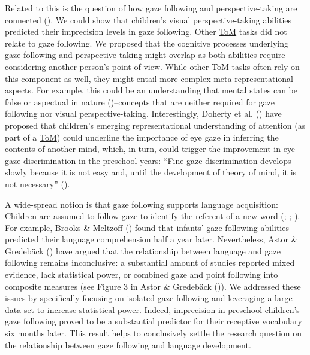 \documentclass[
]{scrbook}
\begin{document}
Related to this is the question of how gaze following and perspective-taking are connected (). We could show that children's visual perspective-taking abilities predicted their imprecision levels in gaze following. Other \hyperref[acronyms_ToM]{ToM} tasks did not relate to gaze following. We proposed that the cognitive processes underlying gaze following and perspective-taking might overlap as both abilities require considering another person's point of view. While other \hyperref[acronyms_ToM]{ToM} tasks often rely on this component as well, they might entail more complex meta-representational aspects. For example, this could be an understanding that mental states can be false or aspectual in nature ()\thinspace --\thinspace concepts that are neither required for gaze following nor visual perspective-taking. Interestingly, Doherty et al. () have proposed that children's emerging representational understanding of attention (as part of a \hyperref[acronyms_ToM]{ToM}) could underline the importance of eye gaze in inferring the contents of another mind, which, in turn, could trigger the improvement in eye gaze discrimination in the preschool years: ``Fine gaze discrimination develops slowly because it is not easy and, until the development of theory of mind, it is not necessary'' ().

A wide-spread notion is that gaze following supports language acquisition: Children are assumed to follow gaze to identify the referent of a new word (; ; ). For example, Brooks \& Meltzoff () found that infants' gaze-following abilities predicted their language comprehension half a year later. Nevertheless, Astor \& Gredebäck () have argued that the relationship between language and gaze following remains inconclusive: a substantial amount of studies reported mixed evidence, lack statistical power, or combined gaze and point following into composite measures (see Figure 3 in Astor \& Gredebäck ()). We addressed these issues by specifically focusing on isolated gaze following and leveraging a large data set to increase statistical power. Indeed, imprecision in preschool children's gaze following proved to be a substantial predictor for their receptive vocabulary six months later. This result helps to conclusively settle the research question on the relationship between gaze following and language development.
\end{document}
